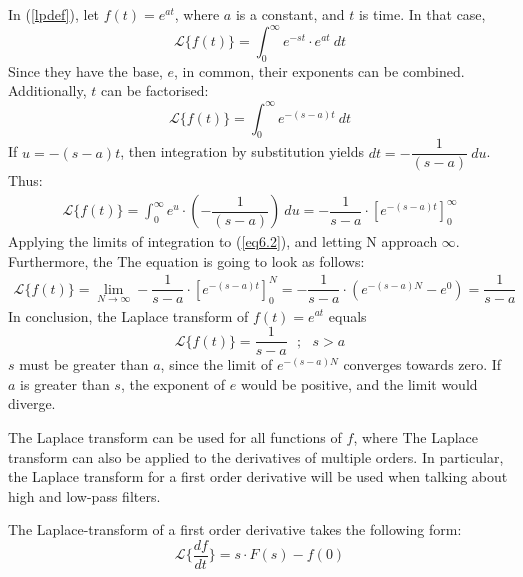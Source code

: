 \begin{tcolorbox}[colback=red!5!white,colframe=red!55!black,title=Example of a Laplace transform]
In (\ref{lpdef}), let $f(t)=e^{at}$, where $a$ is a constant, and $t$ is time. In that case,
$$\mathcal{L}\{f(t)\}=\int_{0}^{\infty} e^{-st}\cdot e^{at}\ dt$$
Since they have the base, $e$, in common, their exponents can be combined. Additionally, $t$ can be factorised:
$$\mathcal{L}\{f(t)\}=\int_{0}^{\infty} e^{-(s-a)t}\ dt$$
If $u=-(s-a)t$, then integration by substitution yields $dt=-\dfrac{1}{(s-a)}\ du$. Thus:
\begin{align}
\mathcal{L}\{f(t)\}=\int_{0}^{\infty} e^{u}\cdot (-\dfrac{1}{(s-a)})\ du =  -\dfrac{1}{s-a} \cdot \left[e^{-(s-a)t} \right]_{0}^{\infty}
\label{eq6.2}
\end{align}
Applying the limits of integration to (\ref{eq6.2}), and letting N approach $\infty$. Furthermore, the The equation is going to look as follows:
\begin{align*}
\mathcal{L}\{f(t)\} = \lim_{N \to \infty} -\dfrac{1}{s-a} \cdot \left[e^{-(s-a)t} \right]_{0}^{N} =-\dfrac{1}{s-a}\cdot (e^{-(s-a)N}-e^{0})=\dfrac{1}{s-a}
\end{align*}
In conclusion, the Laplace transform of $f(t)=e^{at}$ equals
$$\mathcal{L}\{f(t)\}=\dfrac{1}{s-a} \ \ \ ;\ \ \ s>a$$
$s$ must be greater than $a$, since the limit of $e^{-(s-a)N}$ converges towards zero. If $a$ is greater than $s$, the exponent of $e$ would be positive, and the limit would diverge. 
\end{tcolorbox}
The Laplace transform can be used for all functions of $f$, where 
The Laplace transform can also be applied to the derivatives of multiple orders. In particular, the Laplace transform for a first order derivative will be used when talking about high and low-pass filters. 
\begin{tcolorbox}[colback=green!5!white,colframe=green!40!black,title=Theorem 6.1: Laplace transform of a first order derivative]
The Laplace-transform of a first order derivative takes the following form:
$$\mathcal{L}\{\frac{df}{dt}\} = s\cdot F(s)-f(0)$$
\end{tcolorbox}

